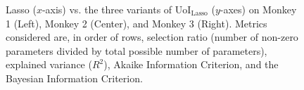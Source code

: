 \documentclass[11pt]{article}
\begin{document}
\begin{figure}[t]

	\caption{Lasso ($x$-axis) vs. the three variants of UoI$_{\text{Lasso}}$ ($y$-axes) on Monkey 1 (Left), Monkey 2 (Center), and Monkey 3 (Right). Metrics considered are, in order of rows, selection ratio (number of non-zero parameters divided by total possible number of parameters), explained variance ($R^2$), Akaike Information Criterion, and the Bayesian Information Criterion.}
	\label{fig:pvc}
\end{figure}
\end{document}
